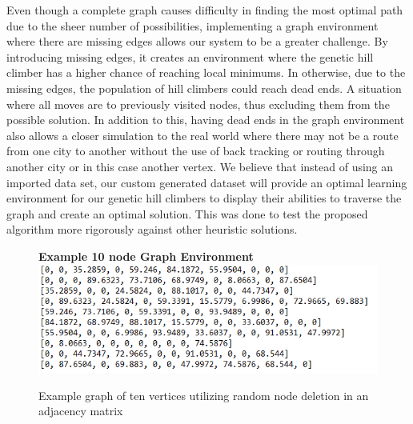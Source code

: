 \documentclass[sigplan,screen]{acmart}
\begin{document}
Even though a complete graph causes difficulty in finding the most optimal path
due to the sheer number of possibilities, implementing a graph environment where
there are missing edges allows our system to be a greater challenge. By
introducing missing edges, it creates an environment where the genetic hill
climber has a higher chance of reaching local minimums. In otherwise, due to the
missing edges, the population of hill climbers could reach dead ends. A
situation where all moves are to previously visited nodes, thus excluding them
from the possible solution. In addition to this, having dead ends in the graph
environment also allows a closer simulation to the real world where there may
not be a route from one city to another without the use of back tracking or
routing through another city or in this case another vertex. We believe that
instead of using an imported data set, our custom generated dataset will provide
an optimal learning environment for our genetic hill climbers to display their
abilities to traverse the graph and create an optimal solution. This was done to
test the proposed algorithm more rigorously against other heuristic solutions.

\begin{figure}[h]
    \centering
    \textbf{Example 10 node Graph Environment}
    \includegraphics[width=\columnwidth]{assets/graph.png}
    \caption{Example graph of ten vertices utilizing random node deletion in an adjacency matrix}
    \label{fig:example_graph}
\end{figure}
\end{document}
